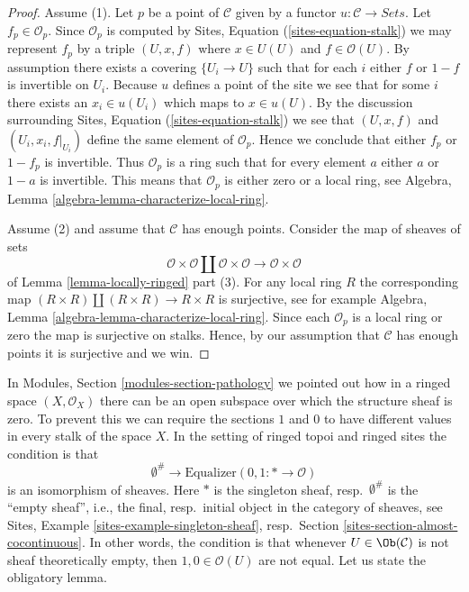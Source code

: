 \begin{proof}
Assume (1). Let $p$ be a point of $\mathcal{C}$ given by a functor
$u : \mathcal{C} \to \textit{Sets}$. Let
$f_p \in \mathcal{O}_p$. Since $\mathcal{O}_p$ is computed by
Sites, Equation (\ref{sites-equation-stalk})
we may represent $f_p$ by a triple
$(U, x, f)$ where $x \in U(U)$ and $f \in \mathcal{O}(U)$.
By assumption there exists a covering $\{U_i \to U\}$
such that for each $i$ either $f$ or $1 - f$ is invertible
on $U_i$. Because $u$ defines a point of the site we see that
for some $i$ there exists an $x_i \in u(U_i)$ which maps to
$x \in u(U)$. By the discussion surrounding
Sites, Equation (\ref{sites-equation-stalk})
we see that $(U, x, f)$ and $(U_i, x_i, f|_{U_i})$ define the
same element of $\mathcal{O}_p$. Hence we conclude that
either $f_p$ or $1 - f_p$ is invertible. Thus
$\mathcal{O}_p$ is a ring such that for every element $a$
either $a$ or $1 - a$ is invertible. This means that $\mathcal{O}_p$
is either zero or a local ring, see
Algebra, Lemma \ref{algebra-lemma-characterize-local-ring}.

\medskip\noindent
Assume (2) and assume that $\mathcal{C}$ has enough points.
Consider the map of sheaves of sets
$$
\mathcal{O} \times \mathcal{O} \amalg \mathcal{O} \times \mathcal{O}
\longrightarrow
\mathcal{O} \times \mathcal{O}
$$
of
Lemma \ref{lemma-locally-ringed} part (3). For any local ring $R$
the corresponding map
$(R \times R) \amalg (R \times R) \to R \times R$
is surjective, see for example
Algebra, Lemma \ref{algebra-lemma-characterize-local-ring}.
Since each $\mathcal{O}_p$ is a local ring or zero the map is
surjective on stalks. Hence, by our assumption that $\mathcal{C}$
has enough points it is surjective and we win.
\end{proof}

\noindent
In
Modules, Section \ref{modules-section-pathology}
we pointed out how in a ringed space $(X, \mathcal{O}_X)$
there can be an open subspace over which the structure sheaf is zero.
To prevent this we can require the sections $1$ and $0$ to have different
values in every stalk of the space $X$. In the setting of ringed topoi
and ringed sites the condition is that
\begin{equation}
\label{equation-one-is-never-zero}
\emptyset^\# \longrightarrow
\text{Equalizer}(0, 1 : * \longrightarrow \mathcal{O})
\end{equation}
is an isomorphism of sheaves. Here $*$ is the singleton sheaf,
resp.\ $\emptyset^\#$ is the ``empty sheaf'',
i.e., the final, resp.\ initial object in the category of sheaves, see
Sites, Example \ref{sites-example-singleton-sheaf},
resp.\ Section \ref{sites-section-almost-cocontinuous}.
In other words, the condition is that whenever $U \in \Ob(\mathcal{C})$
is not sheaf theoretically empty, then $1, 0 \in \mathcal{O}(U)$ are not
equal. Let us state the obligatory lemma.

